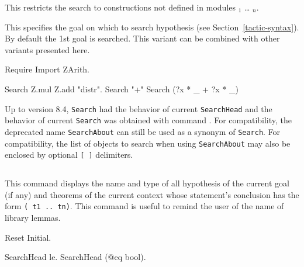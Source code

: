 \begin{Variants}
\item
  {}

This restricts the search to constructions not defined in modules
{\module$_1$} \ldots{} {\module$_n$}.

\item {} %

  This specifies the goal on which to search hypothesis (see
  Section~\ref{tactic-syntax}). By default the 1st goal is searched.
  This variant can be combined with other variants presented here.
\end{Variants}

\examples

\begin{coq_example*}
Require Import ZArith.
\end{coq_example*}
\begin{coq_example}
Search Z.mul Z.add "distr".
Search "+"%
Search (?x * _ + ?x * _)%
\end{coq_example}

\Warning {} Up to {\Coq} version 8.4, {\tt Search}
had the behavior of current {\tt SearchHead} and the behavior of
current {\tt Search} was obtained with command {}. For
compatibility, the deprecated name {\tt SearchAbout} can still be used
as a synonym of {\tt Search}. For compatibility, the list of objects to
search when using {\tt SearchAbout} may also be enclosed by optional
{\tt [ ]} delimiters.

\subsection[\tt SearchHead {\term}.]{}
This command displays the name and type of all hypothesis of the
current goal (if any) and theorems of the current context whose
statement's conclusion has the form {\tt ({\term} t1 ..
  tn)}.  This command is useful to remind the user of the name of
library lemmas.

\begin{coq_eval}
Reset Initial.
\end{coq_eval}

\begin{coq_example}
SearchHead le.
SearchHead (@eq bool).
\end{coq_example}

